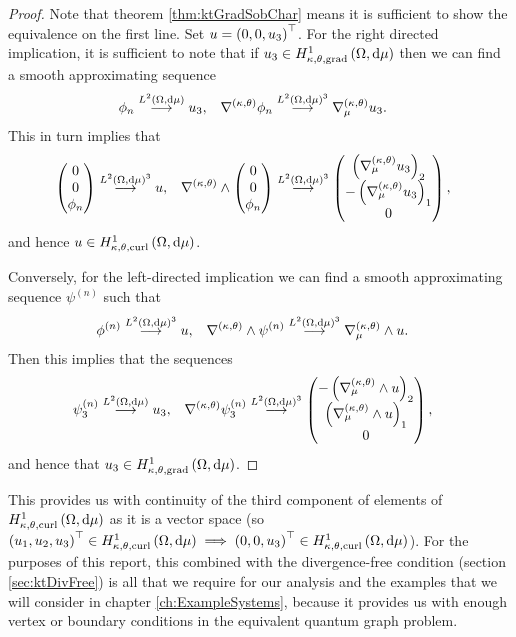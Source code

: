 \begin{proof}
	Note that theorem \ref{thm:ktGradSobChar} means it is sufficient to show the equivalence on the first line.
	Set $u = \left( 0,0,u_3 \right)^{\top}$.
	For the right directed implication, it is sufficient to note that if $u_3\in H^1_{\kappa,\theta,\mathrm{grad}}\left( \Omega, \mathrm{d}\mu \right)$ then we can find a smooth approximating sequence
	\begin{align*}
		\phi_n \overset{L^{2}\left( \Omega,\mathrm{d}\mu \right)}{\longrightarrow} u_3, &\quad \nabla^{\left( \kappa, \theta \right)}\phi_n \overset{L^{2}\left( \Omega,\mathrm{d}\mu \right)^3}{\longrightarrow} \nabla^{\left( \kappa, \theta \right)}_{\mu}u_3.
	\end{align*}
	This in turn implies that
	\begin{align*}
		\begin{pmatrix} 0 \\ 0 \\ \phi_n \end{pmatrix} \overset{L^{2}\left( \Omega,\mathrm{d}\mu \right)^3}{\longrightarrow} u,
		&\quad \nabla_{}^{\left( \kappa, \theta \right)}\wedge \begin{pmatrix} 0 \\ 0 \\ \phi_n \end{pmatrix} \overset{L^{2}\left( \Omega,\mathrm{d}\mu \right)^3}{\longrightarrow} \begin{pmatrix} \left( \nabla^{\left( \kappa, \theta \right)}_{\mu}u_3 \right)_2 \\ -\left( \nabla^{\left( \kappa, \theta \right)}_{\mu}u_3 \right)_1 \\ 0 \end{pmatrix},
	\end{align*}
	and hence $u\in H^1_{\kappa,\theta,\mathrm{curl}}\left( \Omega, \mathrm{d}\mu \right)$. \newline
	
	Conversely, for the left-directed implication we can find a smooth approximating sequence $\psi^{(n)}$ such that
	\begin{align*}
		\phi^{(n)} \overset{L^{2}\left( \Omega,\mathrm{d}\mu \right)^3}{\longrightarrow} u, 
		&\quad \nabla_{}^{\left( \kappa, \theta \right)}\wedge\psi^{(n)} \overset{L^{2}\left( \Omega,\mathrm{d}\mu \right)^3}{\longrightarrow} \nabla_{\mu}^{\left( \kappa, \theta \right)}\wedge u.
	\end{align*}
	Then this implies that the sequences
	\begin{align*}
		\psi^{(n)}_3 \overset{L^{2}\left( \Omega,\mathrm{d}\mu \right)}{\longrightarrow} u_3,
		&\quad \nabla^{\left( \kappa, \theta \right)}\psi^{(n)}_3 \overset{L^{2}\left( \Omega,\mathrm{d}\mu \right)^3}{\longrightarrow} \begin{pmatrix} -\left( \nabla_{\mu}^{\left( \kappa, \theta \right)}\wedge u \right)_2 \\ \left( \nabla_{\mu}^{\left( \kappa, \theta \right)}\wedge u \right)_1 \\ 0 \end{pmatrix},
	\end{align*}
	and hence that $u_3\in H^1_{\kappa,\theta,\mathrm{grad}}\left( \Omega, \mathrm{d}\mu \right)$.
\end{proof}
This provides us with continuity of the third component of elements of $H^1_{\kappa,\theta,\mathrm{curl}}\left( \Omega, \mathrm{d}\mu \right)$ as it is a vector space (so $\left( u_1,u_2,u_3 \right)^{\top}\in H^1_{\kappa,\theta,\mathrm{curl}}\left( \Omega, \mathrm{d}\mu \right) \implies \left( 0,0,u_3 \right)^{\top}\in H^1_{\kappa,\theta,\mathrm{curl}}\left( \Omega, \mathrm{d}\mu \right)$).
For the purposes of this report, this combined with the divergence-free condition (section \ref{sec:ktDivFree}) is all that we require for our analysis and the examples that we will consider in chapter \ref{ch:ExampleSystems}, because it provides us with enough vertex or boundary conditions in the equivalent quantum graph problem. \newline

